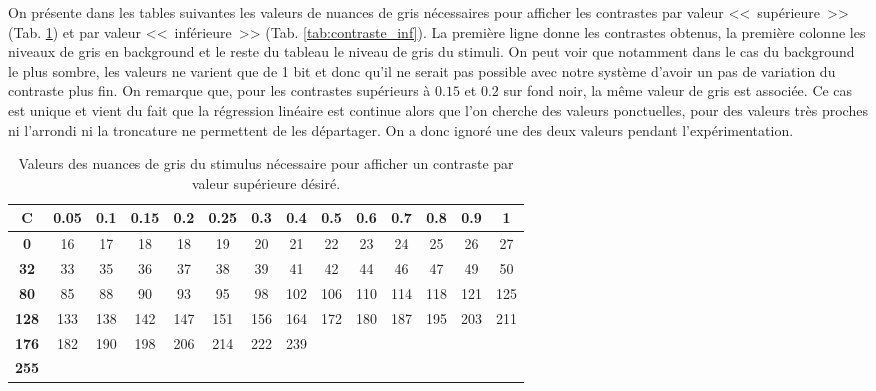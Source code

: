 	\par On présente dans les tables suivantes les valeurs de nuances de gris nécessaires pour afficher les contrastes par valeur <<~supérieure~>> (Tab. \ref{tab:contraste_sup}) et par valeur <<~inférieure~>> (Tab. \ref{tab:contraste_inf}). La première ligne donne les contrastes obtenus, la première colonne les niveaux de gris en background et le reste du tableau le niveau de gris du stimuli. On peut voir que notamment dans le cas du background le plus sombre, les valeurs ne varient que de 1 bit et donc qu'il ne serait pas possible avec notre système d'avoir un pas de variation du contraste plus fin. On remarque que, pour les contrastes supérieurs à $0.15$ et $0.2$ sur fond noir, la même valeur de gris est associée. Ce cas est unique et vient du fait que la régression linéaire est continue alors que l'on cherche des valeurs ponctuelles, pour des valeurs très proches ni l'arrondi ni la troncature ne permettent de les départager. On a donc ignoré une des deux valeurs pendant l'expérimentation.
	
	\begin{table}[h]	
		\centering
		\caption{Valeurs des nuances de gris du stimulus nécessaire pour afficher un contraste par valeur supérieure désiré.}
		\label{tab:contraste_sup}
		\begin{tabular}{c|ccccccccccccc}
			\textbf{C} & \textbf{0.05} & \textbf{0.1} & \textbf{0.15} & \textbf{0.2} & \textbf{0.25} & \textbf{0.3} & \textbf{0.4} & \textbf{0.5} & \textbf{0.6} & \textbf{0.7} & \textbf{0.8} & \textbf{0.9} & \textbf{1}\\
			\hline
			\textbf{0} & 16  & 17  &  18  & 18 & 19 & 20 & 21 & 22 & 23 & 24 & 25 & 26 & 27\\
			\textbf{32} & 33 & 35 & 36 & 37 & 38 & 39 & 41 & 42 & 44 & 46 & 47 & 49 & 50\\
			\textbf{80} & 85 & 88 & 90 & 93 & 95 & 98 & 102 & 106 & 110 & 114 & 118 & 121 & 125\\
			\textbf{128} & 133 & 138 & 142 & 147 & 151 & 156 & 164 & 172 & 180 & 187 & 195 & 203 & 211\\
			\textbf{176} & 182 & 190 & 198 & 206 & 214 & 222 & 239\\
			\textbf{255}\\
		\end{tabular}
	\end{table}
	
